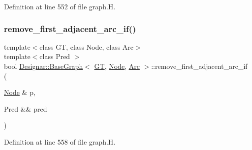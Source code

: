 Definition at line 552 of file graph.\+H.

\mbox{\label{class_designar_1_1_base_graph_abe36f7676c51362b9a0f560d3c062772}} 
\subsubsection{\texorpdfstring{remove\+\_\+first\+\_\+adjacent\+\_\+arc\+\_\+if()}{remove\_first\_adjacent\_arc\_if()}\hspace{0.1cm}{\footnotesize\ttfamily [2/2]}}
{\footnotesize\ttfamily template$<$class GT, class Node, class Arc$>$ \\
template$<$class Pred $>$ \\
bool \hyperlink{class_designar_1_1_base_graph}{Designar\+::\+Base\+Graph}$<$ \hyperlink{demo-buildgraph_8_c_a3001c40d2c31ca87ed96cd7d1334a55e}{GT}, \hyperlink{namespace_designar_a5af326c65aa2bd26b26c410f2030d09e}{Node}, \hyperlink{namespace_designar_a3f55fb5513d62ff47cbc8f72b8e95d6f}{Arc} $>$\+::remove\+\_\+first\+\_\+adjacent\+\_\+arc\+\_\+if (\begin{DoxyParamCaption}\item[{\hyperlink{namespace_designar_a5af326c65aa2bd26b26c410f2030d09e}{Node} \&}]{p,  }\item[{Pred \&\&}]{pred }\end{DoxyParamCaption})\hspace{0.3cm}{\ttfamily [inline]}}



Definition at line 558 of file graph.\+H.

\mbox{\label{class_designar_1_1_base_graph_ae45255ef62c056e76c5e5c45182e9490}} 
